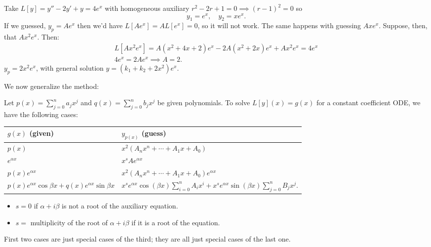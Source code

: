 \begin{example}[Exponential]
    Take $L[y] = y''-2y'+y=4e^x$ with homogeneous auxiliary $r^2 - 2r + 1 = 0 \implies (r-1)^2 = 0$ so $$
    y_1 = e^x, \quad y_2 = xe^x.
    $$
    If we guessed, $y_p = Ae^x$ then we'd have $L[Ae^x] = A L[e^x] = 0$, so it will not work. The same happens with guessing $Axe^x$. Suppose, then, that $Ax^2 e^x$. Then:
    \begin{align*}
        L[Ax^2e^x] = A(x^2 + 4x + 2)e^x - 2A(x^2 + 2x)e^x + Ax^2e^x = 4e^x\\
        4e^x = 2Ae^x \implies A = 2.
    \end{align*}
    $y_p = 2x^2 e^x$, with general solution $y = (k_1 + k_2 + 2x^2)e^x$.
\end{example}

We now generalize the method:

Let $p(x) = \sum_{j=0}^n a_j x^j$ and $q(x) = \sum_{j=0}^n b_j x^j$ be given polynomials. To solve $L[y](x) = g(x)$ for a constant coefficient ODE, we have the following cases:

\begin{table}[!ht]\centering
\begin{tabularx}{\textwidth}{>{\centering\arraybackslash}X | >{\centering\arraybackslash}X }\centering

    $g(x)$ (given) & $y_{p(x)}$ (guess)\\
    \hline
    $p(x)$ &$x^2 (A_n x^n + \cdots + A_1 x + A_0)$\\
    $e^{\alpha x} $&  $x^s Ae^{\alpha x}$\\
    $p(x)e^{\alpha x}$ & $x^2 (A_n x^n + \cdots + A_1 x + A_0)e^{\alpha x}$\\
    $p(x)e^{\alpha x} \cos \beta x + q(x)e^{\alpha x} \sin \beta x$ &  $x^s e^{\alpha x} \cos (\beta x) \sum_{i=0}^n A_i x^i  + x^s e^{\alpha x} \sin (\beta x) \sum_{j=0}^n B_j x^j$.
\end{tabularx}
\end{table}

\begin{itemize}
    \item $s = 0$ if $\alpha + i \beta$ is not a root of the auxiliary equation.
    \item $s = $ multiplicity of the root of $\alpha + i \beta$ if it is a root of the equation.
\end{itemize}
\begin{remark}
    First two cases are just special cases of the third; they are all just special cases of the last one.
\end{remark}